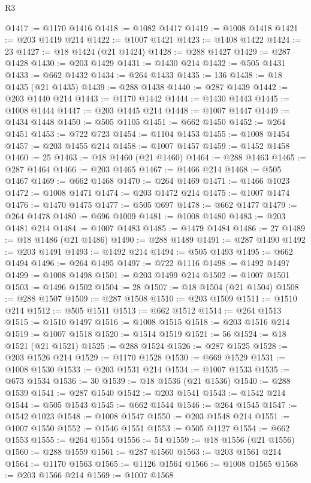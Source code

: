 \begin{lexlean}{R3}
\begin{coremodule}
@1417 := @1170 @1416
@1418 := @1082 @1417
@1419 := @1008 @1418
@1421 := @203 @1419 @214
@1422 := @1007 @1421
@1423 := @1408 @1422
@1424 := 23
@1427 := @18 @1424 (@21 @1424)
@1428 := @288 @1427
@1429 := @287 @1428
@1430 := @203 @1429
@1431 := @1430 @214
@1432 := @505 @1431
@1433 := @662 @1432
@1434 := @264 @1433
@1435 := 136
@1438 := @18 @1435 (@21 @1435)
@1439 := @288 @1438
@1440 := @287 @1439
@1442 := @203 @1440 @214
@1443 := @1170 @1442
@1444 := @1430 @1443
@1445 := @1008 @1444
@1447 := @203 @1445 @214
@1448 := @1007 @1447
@1449 := @1434 @1448
@1450 := @505 @1105
@1451 := @662 @1450
@1452 := @264 @1451
@1453 := @722 @723
@1454 := @1104 @1453
@1455 := @1008 @1454
@1457 := @203 @1455 @214
@1458 := @1007 @1457
@1459 := @1452 @1458
@1460 := 25
@1463 := @18 @1460 (@21 @1460)
@1464 := @288 @1463
@1465 := @287 @1464
@1466 := @203 @1465
@1467 := @1466 @214
@1468 := @505 @1467
@1469 := @662 @1468
@1470 := @264 @1469
@1471 := @1466 @1023
@1472 := @1008 @1471
@1474 := @203 @1472 @214
@1475 := @1007 @1474
@1476 := @1470 @1475
@1477 := @505 @697
@1478 := @662 @1477
@1479 := @264 @1478
@1480 := @696 @1009
@1481 := @1008 @1480
@1483 := @203 @1481 @214
@1484 := @1007 @1483
@1485 := @1479 @1484
@1486 := 27
@1489 := @18 @1486 (@21 @1486)
@1490 := @288 @1489
@1491 := @287 @1490
@1492 := @203 @1491
@1493 := @1492 @214
@1494 := @505 @1493
@1495 := @662 @1494
@1496 := @264 @1495
@1497 := @722 @1116
@1498 := @1492 @1497
@1499 := @1008 @1498
@1501 := @203 @1499 @214
@1502 := @1007 @1501
@1503 := @1496 @1502
@1504 := 28
@1507 := @18 @1504 (@21 @1504)
@1508 := @288 @1507
@1509 := @287 @1508
@1510 := @203 @1509
@1511 := @1510 @214
@1512 := @505 @1511
@1513 := @662 @1512
@1514 := @264 @1513
@1515 := @1510 @1497
@1516 := @1008 @1515
@1518 := @203 @1516 @214
@1519 := @1007 @1518
@1520 := @1514 @1519
@1521 := 56
@1524 := @18 @1521 (@21 @1521)
@1525 := @288 @1524
@1526 := @287 @1525
@1528 := @203 @1526 @214
@1529 := @1170 @1528
@1530 := @669 @1529
@1531 := @1008 @1530
@1533 := @203 @1531 @214
@1534 := @1007 @1533
@1535 := @673 @1534
@1536 := 30
@1539 := @18 @1536 (@21 @1536)
@1540 := @288 @1539
@1541 := @287 @1540
@1542 := @203 @1541
@1543 := @1542 @214
@1544 := @505 @1543
@1545 := @662 @1544
@1546 := @264 @1545
@1547 := @1542 @1023
@1548 := @1008 @1547
@1550 := @203 @1548 @214
@1551 := @1007 @1550
@1552 := @1546 @1551
@1553 := @505 @1127
@1554 := @662 @1553
@1555 := @264 @1554
@1556 := 54
@1559 := @18 @1556 (@21 @1556)
@1560 := @288 @1559
@1561 := @287 @1560
@1563 := @203 @1561 @214
@1564 := @1170 @1563
@1565 := @1126 @1564
@1566 := @1008 @1565
@1568 := @203 @1566 @214
@1569 := @1007 @1568

\end{coremodule}
\end{lexlean}
